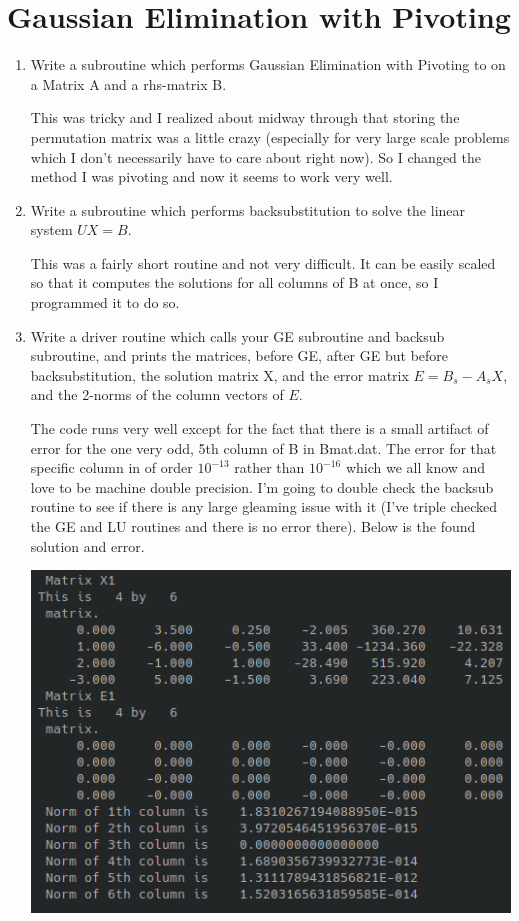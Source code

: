 \documentclass{article}
\begin{document}
\section{Gaussian Elimination with Pivoting}
\begin{enumerate}
\item Write a subroutine which performs Gaussian Elimination with Pivoting to on a Matrix A and a rhs-matrix B. 

This was tricky and I realized about midway through that storing the permutation matrix was a little crazy (especially for very large scale problems which I don't necessarily have to care about right now). So I changed the method I was pivoting and now it seems to work very well. 

\item Write a subroutine which performs backsubstitution to solve the linear system $UX = B$. 

This was a fairly short routine and not very difficult. It can be easily scaled so that it computes the solutions for all columns of B at once, so I programmed it to do so. 

\item Write a driver routine which calls your GE subroutine and backsub subroutine, and prints the matrices, before GE, after GE but before backsubstitution, the solution matrix X, and the error matrix $E = B_s - A_sX$, and the 2-norms of the column vectors of $E$. 

The code runs very well except for the fact that there is a small artifact of error for the one very odd, 5th column of B in Bmat.dat. The error for that specific column in of order $10^{-13}$ rather than $10^{-16}$ which we all know and love to be machine double precision. I'm going to double check the backsub routine to see if there is any large gleaming issue with it (I've triple checked the GE and LU routines and there is no error there). Below is the found solution and error.

\begin{center}
    \includegraphics[width = .6\textwidth]{files/GEsol.png}
\end{center}

\end{enumerate}
\end{document}

